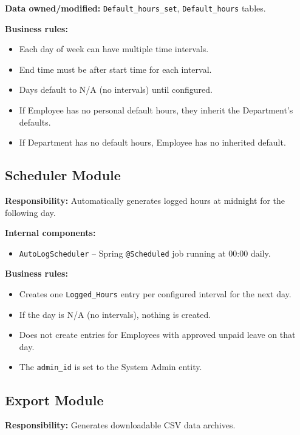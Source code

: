 \documentclass[11pt,a4paper]{article}
\begin{document}
\textbf{Data owned/modified:} \texttt{Default\_hours\_set}, \texttt{Default\_hours} tables.

\textbf{Business rules:}
\begin{itemize}[leftmargin=1.5em]
    \item Each day of week can have multiple time intervals.
    \item End time must be after start time for each interval.
    \item Days default to N/A (no intervals) until configured.
    \item If Employee has no personal default hours, they inherit the Department's defaults.
    \item If Department has no default hours, Employee has no inherited default.
\end{itemize}

\subsection{Scheduler Module}

\textbf{Responsibility:} Automatically generates logged hours at midnight for the following day.

\textbf{Internal components:}
\begin{itemize}[leftmargin=1.5em]
    \item \texttt{AutoLogScheduler} -- Spring \texttt{@Scheduled} job running at 00:00 daily.
\end{itemize}

\textbf{Business rules:}
\begin{itemize}[leftmargin=1.5em]
    \item Creates one \texttt{Logged\_Hours} entry per configured interval for the next day.
    \item If the day is N/A (no intervals), nothing is created.
    \item Does not create entries for Employees with approved unpaid leave on that day.
    \item The \texttt{admin\_id} is set to the System Admin entity.
\end{itemize}

\subsection{Export Module}

\textbf{Responsibility:} Generates downloadable CSV data archives.
\end{document}
